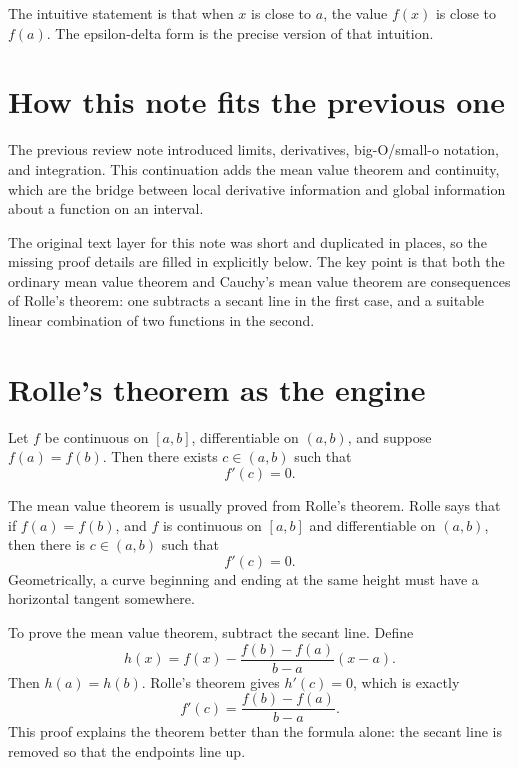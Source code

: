 \begin{remark}
The intuitive statement is that when \(x\) is close to \(a\), the value \(f(x)\) is close to \(f(a)\).  The epsilon-delta form is the precise version of that intuition.
\end{remark}

\section{How this note fits the previous one}

The previous review note introduced limits, derivatives, big-O/small-o notation, and integration.  This continuation adds the mean value theorem and continuity, which are the bridge between local derivative information and global information about a function on an interval.

The original text layer for this note was short and duplicated in places, so the missing proof details are filled in explicitly below.  The key point is that both the ordinary mean value theorem and Cauchy's mean value theorem are consequences of Rolle's theorem: one subtracts a secant line in the first case, and a suitable linear combination of two functions in the second.


\section{Rolle's theorem as the engine}

\begin{theorem}
Let \(f\) be continuous on \([a,b]\), differentiable on \((a,b)\), and suppose \(f(a)=f(b)\).  Then there exists \(c\in(a,b)\) such that
\[
  f'(c)=0.
\]
\end{theorem}


The mean value theorem is usually proved from Rolle's theorem.  Rolle says that if \(f(a)=f(b)\), and \(f\) is continuous on \([a,b]\) and differentiable on \((a,b)\), then there is \(c\in(a,b)\) such that
\[
  f'(c)=0.
\]
Geometrically, a curve beginning and ending at the same height must have a horizontal tangent somewhere.

To prove the mean value theorem, subtract the secant line.  Define
\[
  h(x)=f(x)-\frac{f(b)-f(a)}{b-a}(x-a).
\]
Then \(h(a)=h(b)\).  Rolle's theorem gives \(h'(c)=0\), which is exactly
\[
  f'(c)=\frac{f(b)-f(a)}{b-a}.
\]
This proof explains the theorem better than the formula alone: the secant line is removed so that the endpoints line up.

